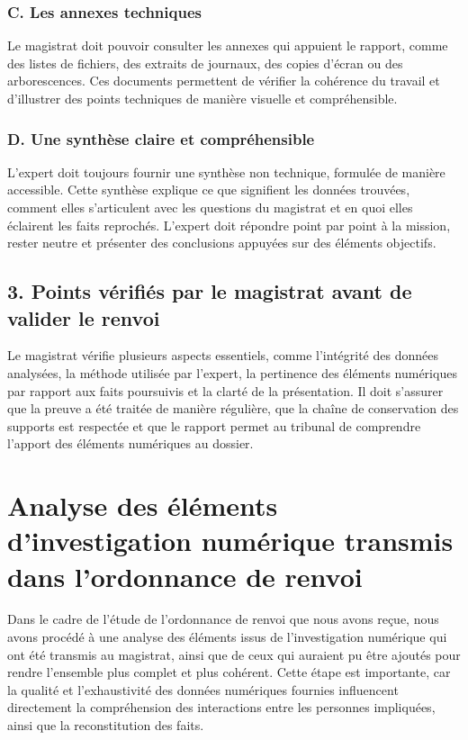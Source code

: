 \documentclass[12pt,a4paper]{report}
\begin{document}
\subsubsection*{C. Les annexes techniques}
Le magistrat doit pouvoir consulter les annexes qui appuient le rapport, comme des listes de fichiers, des extraits de journaux, des copies d'écran ou des arborescences. Ces documents permettent de vérifier la cohérence du travail et d'illustrer des points techniques de manière visuelle et compréhensible.

\subsubsection*{D. Une synthèse claire et compréhensible}
L'expert doit toujours fournir une synthèse non technique, formulée de manière accessible. Cette synthèse explique ce que signifient les données trouvées, comment elles s'articulent avec les questions du magistrat et en quoi elles éclairent les faits reprochés. L'expert doit répondre point par point à la mission, rester neutre et présenter des conclusions appuyées sur des éléments objectifs.

\subsection*{3. Points vérifiés par le magistrat avant de valider le renvoi}

Le magistrat vérifie plusieurs aspects essentiels, comme l'intégrité des données analysées, la méthode utilisée par l'expert, la pertinence des éléments numériques par rapport aux faits poursuivis et la clarté de la présentation. Il doit s'assurer que la preuve a été traitée de manière régulière, que la chaîne de conservation des supports est respectée et que le rapport permet au tribunal de comprendre l'apport des éléments numériques au dossier.

\section*{Analyse des éléments d’investigation numérique transmis dans l’ordonnance de renvoi}

Dans le cadre de l’étude de l’ordonnance de renvoi que nous avons reçue, nous avons procédé à une analyse des éléments issus de l’investigation numérique qui ont été transmis au magistrat, ainsi que de ceux qui auraient pu être ajoutés pour rendre l’ensemble plus complet et plus cohérent. Cette étape est importante, car la qualité et l’exhaustivité des données numériques fournies influencent directement la compréhension des interactions entre les personnes impliquées, ainsi que la reconstitution des faits.
\end{document}
